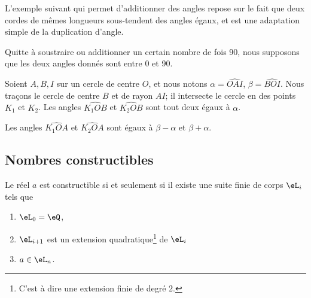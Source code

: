 L'exemple suivant qui permet d'additionner des angles repose sur le fait que deux cordes de mêmes longueurs sous-tendent des angles égaux, et est une adaptation simple de la duplication d'angle.

\begin{example}  \label{ExOVDooXnWPDl}
    Quitte à soustraire ou additionner un certain nombre de fois \unit{90}{\degree}, nous supposons que les deux angles donnés sont entre \unit{0}{\degree} et \unit{90}{\degree}.

    Soient \( A,B,I\) sur un cercle de centre \( O\), et nous notons \( \alpha=\widehat{OAI}\), \( \beta=\widehat{BOI}\). Nous traçons le cercle de centre \( B\) et de rayon \( AI\); il intersecte le cercle en des points \( K_1\) et \( K_2\). Les angles \( \widehat{K_1OB}\) et \( \widehat{K_2OB}\) sont tout deux égaux à \( \alpha\).

    Les angles \( \widehat{K_1OA}\) et \( \widehat{K_2OA}\) sont égaux à \( \beta-\alpha \) et \( \beta+\alpha\).
\end{example}

\subsection{Nombres constructibles}

\begin{theorem} \label{ThoRHFooZsLbqd}
    Le réel \( a\) est constructible si et seulement si il existe une suite finie de corps \( \eL_i\) tels que
    \begin{enumerate}
        \item
            \( \eL_0=\eQ\),
        \item
            \( \eL_{i+1}\) est un extension quadratique\footnote{C'est à dire une extension finie de degré \( 2\).} de \( \eL_i\)
        \item
            \( a\in \eL_n\).
    \end{enumerate}
\end{theorem}

